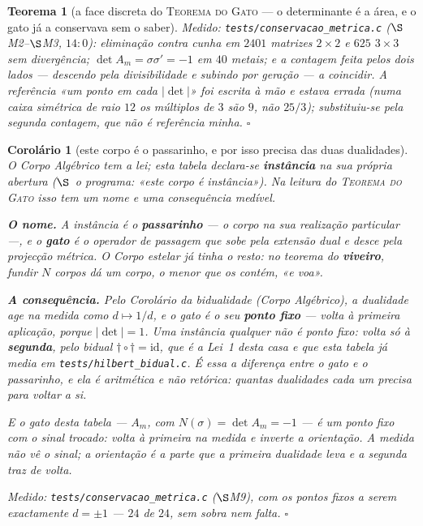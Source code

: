 \documentclass[11pt,a4paper]{article}
\newtheorem{teorema}{Teorema}
\newtheorem{corolario}{Corolário}
\newcommand{\code}[1]{\texttt{#1}}
\begin{document}
\begin{teorema}[a face discreta do \textsc{Teorema do Gato} --- o
determinante é a área, e o gato já a conservava sem o
saber]
\emph{Medido:} \code{tests/conservacao\_metrica.c} ($\S$M2--$\S$M3,
$14{:}0$): eliminação contra cunha em $2401$ matrizes $2\times2$ e $625$
$3\times3$ sem divergência; $\det A_{m}=\sigma\sigma'=-1$ em $40$
metais; e a contagem feita pelos \emph{dois} lados --- descendo pela
divisibilidade e subindo por geração --- a coincidir. A referência
«um ponto em cada $|\det|$» foi escrita à mão e estava errada (numa
caixa simétrica de raio $12$ os múltiplos de $3$ são $9$, não $25/3$);
substituiu-se pela segunda contagem, que não é referência minha.
$\square$
\end{teorema}

\begin{corolario}[este corpo é o passarinho, e por isso precisa das duas
dualidades]\label{cor:passarinho-peano}
O \emph{Corpo Algébrico} tem a lei; esta tabela declara-se
\textbf{instância} na sua própria abertura ($\S$~o programa: «este corpo é
instância»). Na leitura do \textsc{Teorema do Gato} isso tem um nome e
uma consequência medível.

\textbf{O nome.} A instância é o \textbf{passarinho} --- o corpo na sua
realização particular ---, e o \textbf{gato} é o operador de passagem que
sobe pela extensão dual e desce pela projecção métrica. O
\emph{Corpo estelar} já tinha o resto: no teorema do \textbf{viveiro},
fundir $N$ corpos dá \emph{um} corpo, o menor que os contém, «e voa».

\textbf{A consequência.} Pelo Corolário da bidualidade
(\emph{Corpo Algébrico}), a dualidade age na medida como $d\mapsto1/d$, e
o gato é o seu \textbf{ponto fixo} --- volta à primeira aplicação, porque
$|\det|=1$. Uma instância qualquer não é ponto fixo: volta só à
\textbf{segunda}, pelo bidual $\dagger\circ\dagger=\mathrm{id}$, que é a
Lei~1 desta casa e que esta tabela já media em
\code{tests/hilbert\_bidual.c}. É essa a diferença entre o gato e o
passarinho, e ela é aritmética e não retórica: \emph{quantas dualidades
cada um precisa para voltar a si}.

E o gato desta tabela --- $A_{m}$, com $N(\sigma)=\det A_{m}=-1$ --- é um
ponto fixo com o sinal trocado: volta à primeira na \emph{medida} e
inverte a \emph{orientação}. A medida não vê o sinal; a orientação é a
parte que a primeira dualidade leva e a segunda traz de volta.

\emph{Medido:} \code{tests/conservacao\_metrica.c} ($\S$M9), com os
pontos fixos a serem exactamente $d=\pm1$ --- $24$ de $24$, sem sobra nem
falta. $\square$
\end{corolario}
\end{document}

